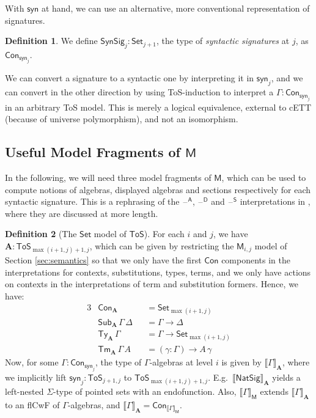 \documentclass{article}
\theoremstyle{definition}
\newtheorem{definition}{Definition}
\theoremstyle{theorem}
\newcommand{\Con}{\mathsf{Con}}
\newcommand{\Sub}{\mathsf{Sub}}
\newcommand{\Tm}{\mathsf{Tm}}
\newcommand{\Ty}{\mathsf{Ty}}
\newcommand{\blank}{\mathord{\hspace{1pt}\text{--}\hspace{1pt}}}
\newcommand{\ra}{\rightarrow}
\newcommand{\Set}{\mathsf{Set}}
\newcommand{\ToS}{\mathsf{ToS}}
\newcommand{\NatSig}{\mathsf{NatSig}}
\newcommand{\A}{\mathsf{A}}
\newcommand{\D}{\mathsf{D}}
\renewcommand{\S}{\mathsf{S}}
\newcommand{\syn}{\mathsf{syn}}
\newcommand{\SynSig}{\mathsf{SynSig}}
\newcommand{\bA}{\boldsymbol{A}}
\newcommand{\bM}{\boldsymbol{\mathsf{M}}}
\newcommand{\llb}{\llbracket}
\newcommand{\rrb}{\rrbracket}
\begin{document}
With $\syn$ at hand, we can use an alternative, more conventional representation of
signatures.

\begin{definition}
We define $\SynSig_j : \Set_{j+1}$, the type of \emph{syntactic signatures} at
$j$, as $\Con_{\syn_j}$.
\end{definition}

We can convert a signature to a syntactic one by interpreting it in $\syn_j$,
and we can convert in the other direction by using ToS-induction to interpret a
$\Gamma : \Con_{\syn_j}$ in an arbitrary ToS model. This is merely a logical
equivalence, external to cETT (because of universe polymorphism), and not an
isomorphism.

\subsection{Useful Model Fragments of $\bM$}

In the following, we will need three model fragments of $\bM$, which can be used
to compute notions of algebras, displayed algebras and sections respectively for
each syntactic signature. This is a rephrasing of the $\blank^{\A}$,
$\blank^{\D}$ and $\blank^{\S}$ interpretations in
\cite{kaposi2019constructing}, where they are discussed at more length.

\begin{definition}[The $\Set$ model of $\ToS$] For each $i$ and $j$, we have $\bA : \ToS_{\max(i+1, j)+1, j}$, which can be given by restricting the $\bM_{i,j}$ model
of Section \ref{sec:semantics} so that we only have the first $\Con$ components
in the interpretations for contexts, substitutions, types, terms, and we only
have actions on contexts in the interpretations of term and substitution
formers. Hence, we have:
\begin{alignat*}{3}
  & \Con_{\bA} && = \Set_{\max(i+1, j)} \\
  & \Sub_{\bA}\,\Gamma\,\Delta && = \Gamma \ra \Delta\\
  & \Ty_{\bA}\,\Gamma && = \Gamma \ra \Set_{\max(i+1, j)}\\
  & \Tm_{\bA}\,\Gamma\,A && = (\gamma : \Gamma) \ra A\,\gamma
\end{alignat*}
Now, for some $\Gamma : \Con_{\syn_j}$, the type of $\Gamma$-algebras at level
$i$ is given by $\llb\Gamma\rrb_{\bA}$, where we implicitly lift $\syn_j :
\ToS_{j+1, j}$ to $\ToS_{\max(i+1,j)+1, j}$. E.g.\, $\llb\NatSig\rrb_{\bA}$
yields a left-nested $\Sigma$-type of pointed sets with an endofunction. Also,
$\llb\Gamma\rrb_{\bM}$ extends $\llb\Gamma\rrb_{\bA}$ to an flCwF of
$\Gamma$-algebras, and $\llb\Gamma\rrb_{\bA} = \Con_{\llb\Gamma\rrb_{\bM}}$.
\end{definition}
\end{document}
